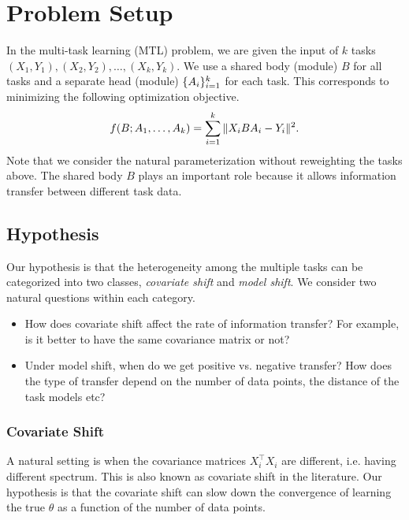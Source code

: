 \section{Problem Setup}\label{sec_setup}

In the multi-task learning (MTL) problem, we are given the input of $k$ tasks $(X_1, Y_1), (X_2, Y_2), \dots, (X_k, Y_k)$.
We use a shared body (module) $B$ for all tasks and a separate head (module) $\{A_i\}_{i=1}^k$ for each task.
This corresponds to minimizing the following optimization objective.
\begin{align}
	\label{eq_mtl}
	f(B; A_1, \dots, A_k) = \sum_{i=1}^k \|X_i B A_i - Y_i\|^2.
\end{align}
Note that we consider the natural parameterization without reweighting the tasks above.
The shared body $B$ plays an important role because it allows information transfer between different task data.

\subsection{Hypothesis}

Our hypothesis is that the heterogeneity among the multiple tasks can be categorized into two classes, \textit{covariate shift} and \textit{model shift}. %
We consider two natural questions within each category.
\begin{itemize}
	\item How does covariate shift affect the rate of information transfer? For example, is it better to have the same covariance matrix or not?
	\item Under model shift, when do we get positive vs. negative transfer? How does the type of transfer depend on the number of data points, the distance of the task models etc?
\end{itemize}

\subsubsection{Covariate Shift}

A natural setting is when the covariance matrices $X_i^{\top} X_i$ are different, i.e. having different spectrum.
This is also known as covariate shift in the literature.
Our hypothesis is that the covariate shift can slow down the convergence of learning the true $\theta$ as a function of the number of data points.


